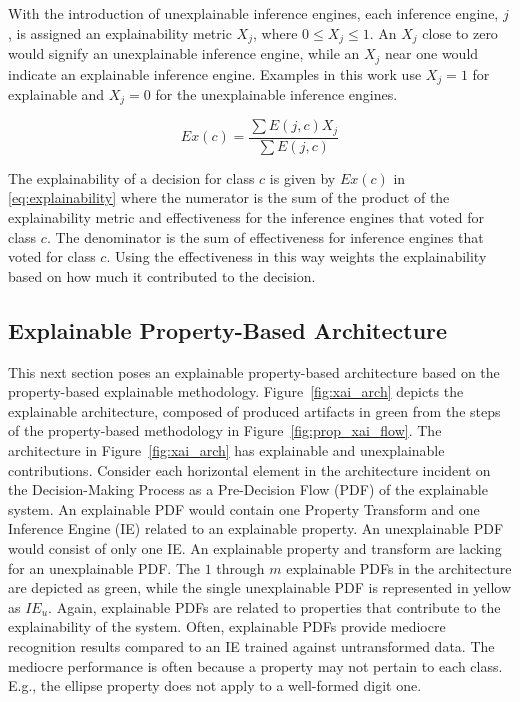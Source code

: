 With the introduction of unexplainable inference engines, each inference engine,
$j$, is assigned an explainability metric $X_j$, where $ 0 \leq X_j \leq 1$. An
$X_j$ close to zero would signify an unexplainable inference engine, while an
$X_j$ near one would indicate an explainable inference engine. Examples in this
work use $X_j=1$ for explainable and $X_j=0$ for the unexplainable inference
engines.

\begin{equation}\label{eq:explainability}
Ex(c)=\frac{\sum{E(j,c)X_j}}{\sum{E(j,c)}}
\end{equation}

The explainability of a decision for class $c$ is given by $Ex(c)$ in
\eqref{eq:explainability} where the numerator is the sum of the product of the
explainability metric and effectiveness for the inference engines that voted for
class $c$. The denominator is the sum of effectiveness for inference engines
that voted for class $c$. Using the effectiveness in this way weights the
explainability based on how much it contributed to the decision.

\subsection{Explainable Property-Based Architecture}

This next section poses an explainable property-based architecture based on the
property-based explainable methodology. Figure~\ref{fig:xai_arch} depicts the
explainable architecture, composed of produced artifacts in green from the steps
of the property-based methodology in Figure~\ref{fig:prop_xai_flow}. The
architecture in Figure~\ref{fig:xai_arch} has explainable and unexplainable
contributions. Consider each horizontal element in the architecture incident on
the Decision-Making Process as a Pre-Decision Flow (PDF) of the explainable
system. An explainable PDF would contain one Property Transform and one
Inference Engine (IE) related to an explainable property. An unexplainable PDF
would consist of only one IE.  An explainable property and transform are lacking
for an unexplainable PDF. The $1$ through $m$ explainable PDFs in the
architecture are depicted as green, while the single unexplainable PDF is
represented in yellow as $IE_u$. Again, explainable PDFs are related to
properties that contribute to the explainability of the system. Often,
explainable PDFs provide mediocre recognition results compared to an IE trained
against untransformed data. The mediocre performance is often because a property
may not pertain to each class. E.g., the ellipse property does not apply to a
well-formed digit one.

